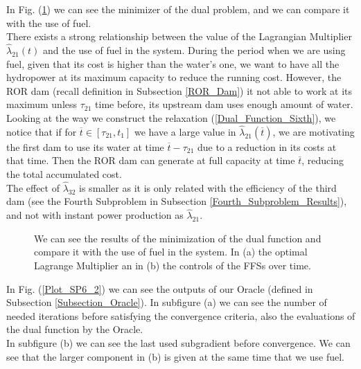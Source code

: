 In Fig. (\ref{Plot_SP6_1}) we can see the minimizer of the dual problem, and we can compare it with the use of fuel.\\
There exists a strong relationship between the value of the Lagrangian Multiplier $\hat{\lambda}_{21}(t)$ and the use of fuel in the system. During the period when we are using fuel, given that its cost is higher than the water's one, we want to have all the hydropower at its maximum capacity to reduce the running cost. However, the ROR dam (recall definition in Subsection \ref{ROR_Dam}) it not able to work at its maximum unless $\tau_{21}$ time before, its upstream dam uses enough amount of water.\\
Looking at the way  we construct the relaxation (\ref{Dual_Function_Sixth}), we notice that if for $\overline{t}\in[\tau_{21},t_1]$ we have a large value in $\hat{\lambda}_{21}(\overline{t})$, we are motivating the first dam to use its water at time $\overline{t}-\tau_{21}$ due to a reduction in its costs at that time. Then the ROR dam can generate at full capacity at time $\overline{t}$, reducing the total accumulated cost.\\
The effect of $\hat{\lambda}_{32}$ is smaller as it is only related with the efficiency of the third dam (see the Fourth Subproblem in Subsection \ref{Fourth_Subproblem_Results}), and not with instant power production as $\hat{\lambda}_{21}$.

\begin{figure}[H]
\centering
{}\qquad
{}
\caption{We can see the results of the minimization of the dual function and compare it with the use of fuel in the system. In (a) the optimal Lagrange Multiplier an in (b) the controls of the FFSs over time.}
\label{Plot_SP6_1}
\end{figure}

In Fig. (\ref{Plot_SP6_2}) we can see the outputs of our Oracle (defined in Subsection \ref{Subsection_Oracle}). In subfigure (a) we can see the number of needed iterations before satisfying the convergence criteria, also the evaluations of the dual function by the Oracle.\\
In subfigure (b) we can see the last used subgradient before convergence. We can see that the larger component in (b) is given at the same time that we use fuel.

